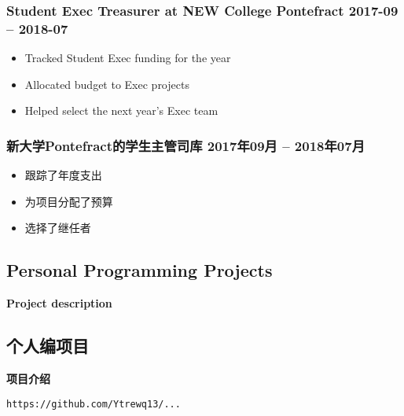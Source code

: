 \begin{xen}
        \subsubsection{Student Exec Treasurer at NEW College Pontefract
        \hfill 2017-09 -- 2018-07}
            \begin{itemize}
                \item Tracked Student Exec funding for the year
                \item Allocated budget to Exec projects
                \item Helped select the next year's Exec team
            \end{itemize}
\end{xen}
\begin{xcn}
        \subsubsection{新大学Pontefract的学生主管司库 %
        \hfill 2017年09月 -- 2018年07月}
            \begin{itemize}
                \item 跟踪了年度支出
                \item 为项目分配了预算
                \item 选择了继任者
            \end{itemize}
\end{xcn}
\begin{xen}
    \subsection{Personal Programming Projects}
        \hspace{1em} \textbf{Project description}
\end{xen}
\begin{xcn}
    \subsection{个人编项目} %
        \hspace{1em} \textbf{项目介绍} %
\end{xcn}
        \hfill
        \texttt{https://github.com/Ytrewq13/...}
